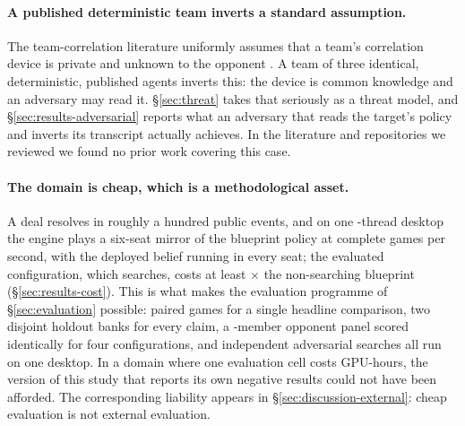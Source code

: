 \paragraph{A published deterministic team inverts a standard assumption.}
The team-correlation literature uniformly assumes that a team's correlation device is private and
unknown to the opponent \cite{celli-gatti,farina-collusion,zhang-tbdag}. A team of three identical,
deterministic, published agents inverts this: the device is common knowledge and an adversary may
read it. \S\ref{sec:threat} takes that seriously as a threat model, and
\S\ref{sec:results-adversarial} reports what an adversary that reads the target's policy and inverts
its transcript actually achieves. In the literature and repositories we reviewed we found no prior
work covering this case.

\paragraph{The domain is cheap, which is a methodological asset.}
A deal resolves in roughly a hundred public events, and on one \vsevenMirrorThreads{}-thread
desktop the engine plays a six-seat mirror of the blueprint policy at \vsevenMirrorGamesPerSec{}
complete games per second, with the deployed belief running in every seat; the evaluated
configuration, which searches, costs at least \vsevenCostFrozenTight$\times$ the non-searching
blueprint (\S\ref{sec:results-cost}). This is what makes
the evaluation programme of \S\ref{sec:evaluation} possible: \vsevenBtwoFcheapN{} paired games for a
single headline comparison, two disjoint holdout banks for every claim, a \vsevenPanelMembers{}-member
opponent panel scored identically for four configurations, and \vsevenBfourArmsWord{} independent
adversarial searches all run on one desktop. In a domain where one evaluation cell costs
GPU-hours, the version of this study that reports its own negative results could not have been
afforded. The corresponding liability appears in \S\ref{sec:discussion-external}: cheap evaluation is
not external evaluation.

